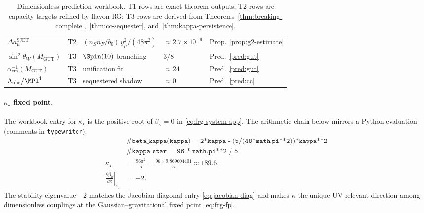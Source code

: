 \begin{table}[ht]
\begin{tabular}{@{}lllll@{}}
$\Delta a_\mu^{\mathrm{SJET}}$ & T2 &
$(n_S n_F/b_0)\,y_\mu^2/(48\pi^2)$ &
$\approx 2.7\times10^{-9}$ &
Prop.~\ref{prop:g2-estimate} \\
$\sin^2\theta_W(M_{\mathrm{GUT}})$ & T3 & $\Spin(10)$ branching & $3/8$ &
Pred.~\ref{pred:gut} \\
$\alpha_{\mathrm{em}}^{-1}(M_{\mathrm{GUT}})$ & T3 & unification fit &
$\approx 24$ &
Pred.~\ref{pred:gut} \\
$\Lambda_{\mathrm{obs}}/\MPl^4$ & T3 & sequestered shadow &
$\approx 0$ &
Pred.~\ref{pred:cc} \\
\bottomrule
\end{tabular}
\caption{Dimensionless prediction workbook. T1 rows are exact theorem outputs;
T2 rows are capacity targets refined by flavon RG; T3 rows are derived from
Theorems~\ref{thm:breaking-complete},~\ref{thm:cc-sequester},
and~\ref{thm:kappa-persistence}.}
\label{tab:numerical-workbook}
\end{table}

\paragraph{$\kappa_\star$ fixed point.}
The workbook entry for $\kappa_\star$ is the positive root of
$\beta_\kappa=0$ in \eqref{eq:frg-system-app}. The arithmetic chain below
mirrors a Python evaluation (comments in \texttt{typewriter}):
\begin{equation}\label{eq:workbook-kappa}
\begin{aligned}
  &\texttt{\# beta\_kappa(kappa) = 2*kappa - (5/(48*math.pi**2))*kappa**2}\\
  &\texttt{\# kappa\_star = 96 * math.pi**2 / 5}\\
  \kappa_\star
  &= \frac{96\pi^2}{5}
  = \frac{96\times 9.869604401}{5}
  \approx 189.6,\\
  \left.\frac{\partial\beta_\kappa}{\partial\kappa}\right|_{\kappa_\star}
  &= -2.
\end{aligned}
\end{equation}
The stability eigenvalue $-2$ matches the Jacobian diagonal entry
\eqref{eq:jacobian-diag} and makes $\kappa$ the unique UV-relevant direction
among dimensionless couplings at the Gaussian--gravitational fixed point
\eqref{eq:frg-fp}.

